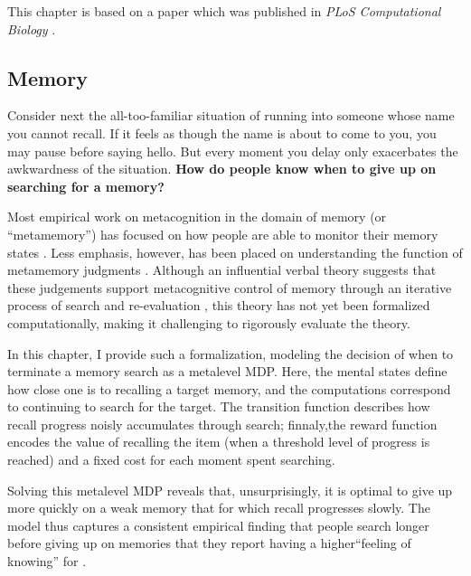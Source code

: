 \documentclass[12pt,a4paperpaper,]{article}
\begin{document}
This chapter is based on a paper which was published in \emph{PLoS Computational Biology} \citep{callaway2021fixation}.

\subsection{Memory}

Consider next the all-too-familiar situation of running into someone whose name you cannot recall. If it feels as though the name is about to come to you, you may pause before saying hello. But every moment you delay only exacerbates the awkwardness of the situation. \textbf{How do people know when to give up on searching for a memory?}

Most empirical work on metacognition in the domain of memory (or ``metamemory'') has focused on how people are able to monitor their memory states \citep{reder1992determines,miner1994new,eakin2005illusions,hart1965memory,vesonder1985ability,dunlosky1992importance,dunlosky2007metacomprehension}. Less emphasis, however, has been placed on understanding the function of metamemory judgments \citep{schwartz2017metamemory}. Although an influential verbal theory suggests that these judgements support metacognitive control of memory through an iterative process of search and re-evaluation \citep{nelson1990metamemory}, this theory has not yet been formalized computationally, making it challenging to rigorously evaluate the theory.

In this chapter, I provide such a formalization, modeling the decision of when to terminate a memory search as a metalevel MDP. Here, the mental states define how close one is to recalling a target memory, and the computations correspond to continuing to search for the target. The transition function describes how recall progress noisly accumulates through search; finnaly,the reward function encodes the value of recalling the item (when a threshold level of progress is reached) and a fixed cost for each moment spent searching.

Solving this metalevel MDP reveals that, unsurprisingly, it is optimal to give up more quickly on a weak memory that for which recall progresses slowly. The model thus captures a consistent empirical finding that people search longer before giving up on memories that they report having a higher``feeling of knowing'' for \citealp{nelson1984comparison,nhouyvanisvong1998rapid,gruneberg1977methodological,lachman1979metamemory}.
\end{document}

